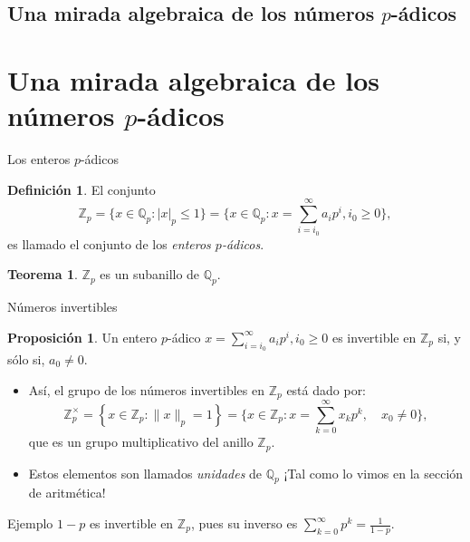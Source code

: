 \documentclass{beamer}
\theoremstyle{definition}
\numberwithin{equation}{section}
\newcommand{\marine}[1]{\textcolor{defColor}{#1}}
\newcommand{\orangee}[1]{\textcolor{thColor}{#1}}
\newtheorem{df}{\marine{Definición}}
\newtheorem{thh}{\orangee{Teorema}}
\newtheorem{pr}{\orangee{Proposición}}
\newcommand{\tit}[1]{\textit{#1}}
\renewcommand{\geq}{\geqslant}
\renewcommand{\leq}{\leqslant}
\newcommand{\Qp}{\mathbb{Q}_p}
\newcommand{\Zp}{\mathbb{Z}_p}
\newcommand{\pnorm}[1]{\|#1\|_p}
\begin{document}
\subsection{Una mirada algebraica de los números $p$-ádicos}
\section*{Una mirada algebraica de los números $p$-ádicos}

\begin{frame}{Los enteros $p$-ádicos}
	\begin{df}
		El conjunto
		\[
		\mathbb{Z}_{p} =\{x\in\Qp:|x|_{p}\leq1\}=\{x\in\Qp:x=\sum_{i=i_{0}}^{\infty} a_{i}p^{i},i_{0}\geq0\},
		\]
		es llamado el conjunto de los \textit{enteros $p$-ádicos}.
	\end{df}
\begin{thh}
	$\Zp$ es un subanillo de $\Qp$.
\end{thh}
\end{frame}

\begin{frame}{Números invertibles}
\begin{pr}
	Un entero $p$-ádico $x=\sum_{i=i_{0}}^{\infty}a_{i}p^{i},i_{0}\geq0$ es invertible en $\Zp$ si, y sólo si, $a_0\neq 0$.
\end{pr}
\begin{itemize}
	\item Así, el grupo de los números invertibles en $\Zp$ está dado por:
	$$
	\mathbb{Z}_{p}^{\times}=\left\{x \in \mathbb{Z}_{p}:\pnorm{x}=1\right\}=\Big\{x \in \mathbb{Z}_{p}: x=\sum_{k=0}^{\infty} x_{k} p^{k}, \quad x_{0} \neq 0\Big\},$$
	que es un grupo multiplicativo del anillo $\Zp$.
	\item Estos elementos son llamados \tit{unidades} de $\Qp$ ¡Tal como lo vimos en la sección de aritmética!
\end{itemize}
\begin{exampleblock}{Ejemplo}
	$1-p$ es invertible en $\Zp$, pues su inverso es $\sum_{k=0}^{\infty}p^k=\frac{1}{1-p}.$
\end{exampleblock}
\end{frame}
\end{document}
